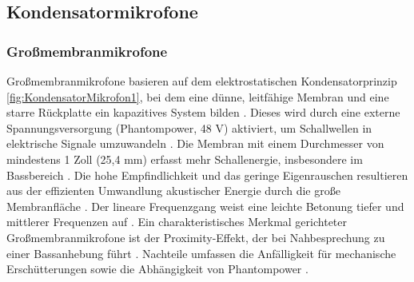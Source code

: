 \bigskip

\subsection{Kondensatormikrofone}

\subsubsection{Großmembranmikrofone}
Großmembranmikrofone basieren auf dem elektrostatischen Kondensatorprinzip \ref{fig:KondensatorMikrofon1}, bei dem eine dünne, leitfähige Membran und eine starre Rückplatte ein kapazitives System bilden \cite{Görne:2014d}. Dieses wird durch eine externe Spannungsversorgung (Phantompower, 48 V) aktiviert, um Schallwellen in elektrische Signale umzuwandeln \cite{Weinzierl:2008}\cite{Bernstein:2019a}. Die Membran mit einem Durchmesser von mindestens 1 Zoll (25,4 mm) erfasst mehr Schallenergie, insbesondere im Bassbereich \cite{Weinzierl:2008}.
Die hohe Empfindlichkeit und das geringe Eigenrauschen resultieren aus der effizienten Umwandlung akustischer Energie durch die große Membranfläche \cite{Weinzierl:2008}. Der lineare Frequenzgang weist eine leichte Betonung tiefer und mittlerer Frequenzen auf \cite{Weinzierl:2008}.
Ein charakteristisches Merkmal gerichteter Großmembranmikrofone ist der Proximity-Effekt, der bei Nahbesprechung zu einer Bassanhebung führt \cite{Weinzierl:2008}.
Nachteile umfassen die Anfälligkeit für mechanische Erschütterungen sowie die Abhängigkeit von Phantompower \cite{Weinzierl:2008}.

\bigskip


